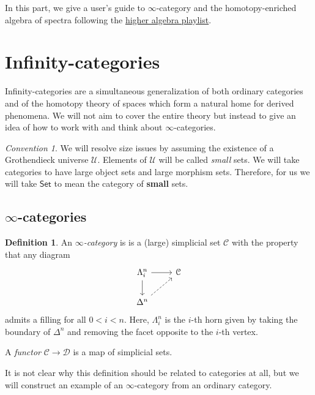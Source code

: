 \documentclass[10pt]{amsart}
\theoremstyle{definition}
\newtheorem{defn}[thm]{Definition}
\theoremstyle{remark}
\newtheorem{conv}[thm]{Convention}
\theoremstyle{plain}
\theoremstyle{definition}
\theoremstyle{remark}
\newcommand{\mc}[1]{\mathcal{#1}}
\newcommand{\ms}[1]{\mathsf{#1}}
\newcommand{\1}{\mathbf{1}}
\newcommand{\2}{\mathbf{2}}
\newcommand{\3}{\mathbf{3}}
\begin{document}
In this part, we give a user's guide to $\infty$-category and the homotopy-enriched algebra of spectra following the \href{https://www.youtube.com/playlist?list=PLsmqTkj4MGTDenpj574aSvIRBROwCugoB}{higher algebra playlist}.

\section{Infinity-categories}%
\label{sec:Infinity-categories}

Infinity-categories are a simultaneous generalization of both ordinary categories and of the homotopy theory of spaces which form a natural home for derived phenomena. We will not aim to cover the entire theory but instead to give an idea of how to work with and think about $\infty$-categories.

\begin{conv}
    We will resolve size issues by assuming the existence of a Grothendieck universe $\mc{U}$. Elements of $\mc{U}$ will be called \textit{small} sets. We will take categories to have large object sets and large morphism sets. Therefore, for us we will take $\ms{Set}$ to mean the category of \textbf{small} sets.
\end{conv}

\subsection{$\infty$-categories}%
\label{sub:infinity cats}

\begin{defn}
    An \textit{$\infty$-category} is is a (large) simplicial set $\mc{C}$ with the property that any diagram
    \begin{equation*}
    \begin{tikzcd}
        \Lambda_i^n \ar{r} \ar{d} & \mc{C} \\
        \Delta^n \ar[dashrightarrow]{ur}
    \end{tikzcd}
    \end{equation*}
    admits a filling for all $0 < i < n$. Here, $\Lambda_i^n$ is the $i$-th horn given by taking the boundary of $\Delta^n$ and removing the facet opposite to the $i$-th vertex.

    A \textit{functor} $\mc{C} \to \mc{D}$ is a map of simplicial sets.
\end{defn}

It is not clear why this definition should be related to categories at all, but we will construct an example of an $\infty$-category from an ordinary category.
\end{document}
